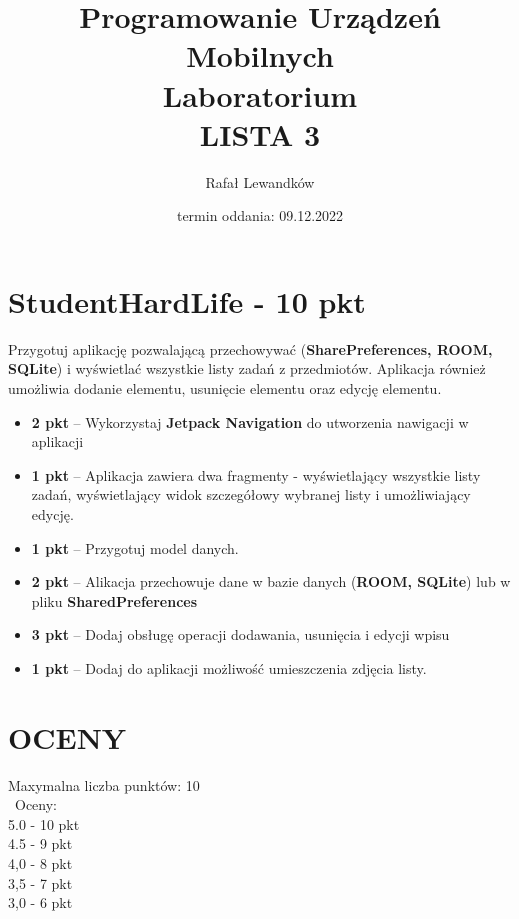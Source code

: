 \documentclass[a4paper]{article}
\title{Programowanie Urządzeń Mobilnych \\ Laboratorium \\ \textbf{LISTA 3}}
\author{Rafał Lewandków}
\date{termin oddania: 09.12.2022}
\begin{document}
\maketitle
    

\section*{StudentHardLife - 10 pkt}

Przygotuj aplikację pozwalającą przechowywać (\textbf{SharePreferences, ROOM, SQLite}) i wyświetlać wszystkie listy zadań z przedmiotów. Aplikacja również umożliwia dodanie elementu, usunięcie elementu oraz edycję elementu. 

\begin{itemize}
\item \textbf{2 pkt} -- Wykorzystaj \textbf{Jetpack Navigation} do utworzenia nawigacji w aplikacji

\item \textbf{1 pkt} -- Aplikacja zawiera dwa fragmenty - wyświetlający wszystkie listy zadań, wyświetlający widok szczegółowy wybranej listy i umożliwiający edycję.

\item \textbf{1 pkt} -- Przygotuj model danych.

\item \textbf{2 pkt} -- Alikacja przechowuje dane w bazie danych (\textbf{ROOM, SQLite}) lub w pliku \textbf{SharedPreferences}

\item \textbf{3 pkt} -- Dodaj obsługę operacji dodawania, usunięcia i edycji wpisu

\item \textbf{1 pkt} -- Dodaj do aplikacji możliwość umieszczenia zdjęcia listy.
\end{itemize}

\section*{OCENY}
Maxymalna liczba punktów: 10\\\
Oceny:\\
5.0 - 10 pkt\\
4.5 - 9 pkt\\
4,0 - 8 pkt\\
3,5 - 7 pkt\\
3,0 - 6 pkt
\end{document}
